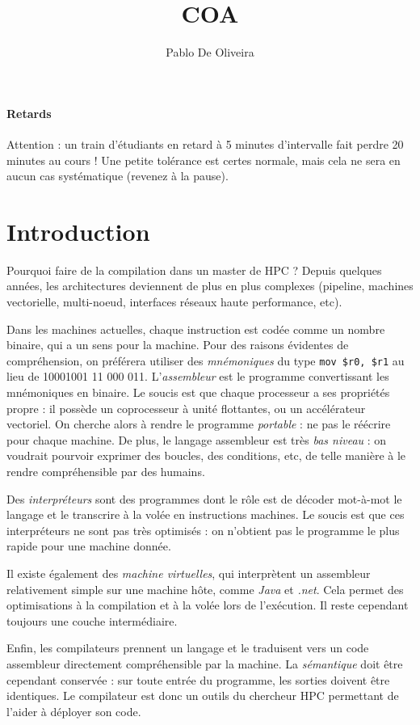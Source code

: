 \documentclass{article}
\title{COA}
\author{Pablo De Oliveira}
\date{}
\begin{document}
\maketitle
\tableofcontents
\newpage

\paragraph{Retards}
Attention : un train d'étudiants en retard à 5 minutes d'intervalle fait perdre 20 minutes au cours ! Une petite tolérance est certes normale, mais cela ne sera en aucun cas systématique (revenez à la pause).

\section{Introduction}
Pourquoi faire de la compilation dans un master de HPC ? Depuis quelques années, les architectures deviennent de plus en plus complexes (pipeline, machines vectorielle, multi-noeud, interfaces réseaux haute performance, etc).

Dans les machines actuelles, chaque instruction est codée comme un nombre binaire, qui a un sens pour la machine. Pour des raisons évidentes de compréhension, on préférera utiliser des \emph{mnémoniques} du type \texttt{mov \$r0, \$r1} au lieu de 10001001 11 000 011. L'\emph{assembleur} est le programme convertissant les mnémoniques en binaire. Le soucis est que chaque processeur a ses propriétés propre : il possède un coprocesseur à unité flottantes, ou un accélérateur vectoriel. On cherche alors à rendre le programme \emph{portable} : ne pas le réécrire pour chaque machine. De plus, le langage assembleur est très \emph{bas niveau} : on voudrait pourvoir exprimer des boucles, des conditions, etc, de telle manière à le rendre compréhensible par des humains.
\bigskip


Des \emph{interpréteurs} sont des programmes dont le rôle est de décoder mot-à-mot le langage et le transcrire à la volée en instructions machines. Le soucis est que ces interpréteurs ne sont pas très optimisés : on n'obtient pas le programme le plus rapide pour une machine donnée. 

Il existe également des \emph{machine virtuelles}, qui interprètent un assembleur relativement simple sur une machine hôte, comme \emph{Java} et \emph{.net}. Cela permet des optimisations à la compilation et à la volée lors de l'exécution. Il reste cependant toujours une couche intermédiaire.

Enfin, les compilateurs prennent un langage et le traduisent vers un code assembleur directement compréhensible par la machine. La \emph{sémantique} doit être cependant conservée : sur toute entrée du programme, les sorties doivent être identiques. Le compilateur est donc un outils du chercheur HPC permettant de l'aider à déployer son code.
\end{document}
